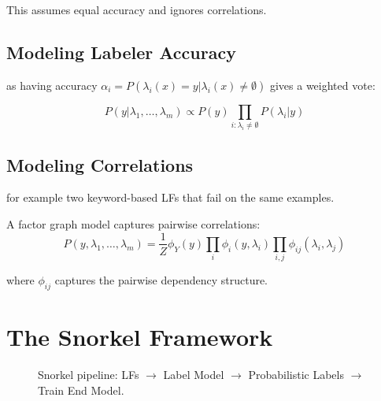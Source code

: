 This assumes equal accuracy and ignores correlations.

\subsection{Modeling Labeler Accuracy}

 as having accuracy $\alpha_i = P(\lambda_i(x) = y | \lambda_i(x) \neq \emptyset)$ gives a weighted vote:

\begin{equation}
    P(y | \lambda_1, \ldots, \lambda_m) \propto P(y) \prod_{i: \lambda_i \neq \emptyset} P(\lambda_i | y)
\end{equation}

\subsection{Modeling Correlations}

 for example two keyword-based LFs that fail on the same examples.

A factor graph model captures pairwise correlations:
\begin{equation}
    P(y, \lambda_1, \ldots, \lambda_m) = \frac{1}{Z} \phi_Y(y) \prod_i \phi_i(y, \lambda_i) \prod_{i,j} \phi_{ij}(\lambda_i, \lambda_j)
\end{equation}

where $\phi_{ij}$ captures the pairwise dependency structure.


\section{The Snorkel Framework}


\begin{figure}
\centering
{}
\caption{Snorkel pipeline: LFs $\to$ Label Model $\to$ Probabilistic Labels $\to$ Train End Model.}
\label{fig:snorkel_pipeline}
\end{figure}

